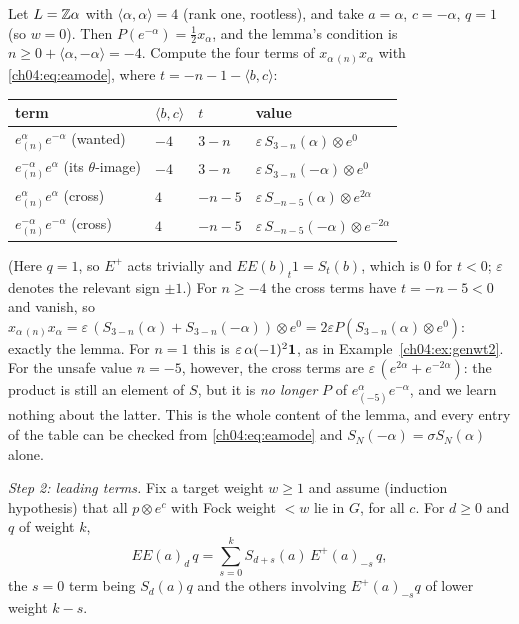 \begin{example}\label{ch04:ex:saferank1}
Let $L={\mathbb{Z}}\alpha$ with $\langle\alpha,\alpha\rangle=4$ (rank one, rootless), and take $a=\alpha$, $c=-\alpha$,
$q=1$ (so $w=0$). Then $P(e^{-\alpha})=\tfrac12x_\alpha$, and the lemma's condition is
$n\ge0+\langle\alpha,-\alpha\rangle=-4$. Compute the four terms of $x_{\alpha\,(n)}x_\alpha$ with
\eqref{ch04:eq:eamode}, where $t=-n-1-\langle b,c\rangle$:
\begin{center}
\begin{tabular}{llll}
\toprule
term & $\langle b,c\rangle$ & $t$ & value\\
\midrule
$e^{\alpha}_{(n)}e^{-\alpha}$ (wanted) & $-4$ & $3-n$ & $\varepsilon\,S_{3-n}(\alpha)\otimes e^0$\\
$e^{-\alpha}_{(n)}e^{\alpha}$ (its $\theta$-image) & $-4$ & $3-n$ & $\varepsilon\,S_{3-n}(-\alpha)\otimes e^0$\\
$e^{\alpha}_{(n)}e^{\alpha}$ (cross) & $4$ & $-n-5$ & $\varepsilon\,S_{-n-5}(\alpha)\otimes e^{2\alpha}$\\
$e^{-\alpha}_{(n)}e^{-\alpha}$ (cross) & $4$ & $-n-5$ & $\varepsilon\,S_{-n-5}(-\alpha)\otimes e^{-2\alpha}$\\
\bottomrule
\end{tabular}
\end{center}
(Here $q=1$, so $E^+$ acts trivially and $EE(b)_t1=S_t(b)$, which is $0$ for $t<0$; $\varepsilon$ denotes
the relevant sign $\pm1$.) For $n\ge-4$ the cross terms have $t=-n-5<0$ and vanish, so
$x_{\alpha\,(n)}x_\alpha=\varepsilon\,(S_{3-n}(\alpha)+S_{3-n}(-\alpha))\otimes e^0=2\varepsilon P(S_{3-n}(\alpha)\otimes e^0)$:
exactly the lemma. For $n=1$ this is $\varepsilon\,\alpha(-1)^2\mathbf{1}$, as in Example~\ref{ch04:ex:genwt2}.
For the unsafe value $n=-5$, however, the cross terms are $\varepsilon\,(e^{2\alpha}+e^{-2\alpha})$: the product
is still an element of $S$, but it is \emph{no longer} $P$ of $e^\alpha_{(-5)}e^{-\alpha}$, and we learn
nothing about the latter. This is the whole content of the lemma, and every entry of the table can
be checked from \eqref{ch04:eq:eamode} and $S_N(-\alpha)=\sigma S_N(\alpha)$ alone.
\end{example}

\emph{Step 2: leading terms.} Fix a target weight $w\ge1$ and assume (induction hypothesis) that
all $p\otimes e^c$ with Fock weight $<w$ lie in $G$, for all $c$. For $d\ge0$ and $q$ of weight $k$,
\begin{equation}\label{ch04:eq:EEexpand}
  EE(a)_d\,q=\sum_{s=0}^{k}S_{d+s}(a)\,E^+(a)_{-s}\,q ,
\end{equation}
the $s=0$ term being $S_d(a)q$ and the others involving $E^+(a)_{-s}q$ of lower weight $k-s$.

